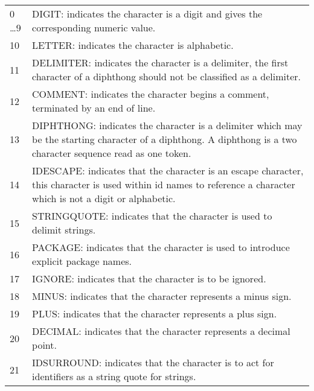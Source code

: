 \begin{tabular}{lp{13.0cm}}
0 \ldots 9 & DIGIT: indicates the character is a digit  and gives the 
                   	corresponding numeric value.\\
10 &       LETTER: indicates the character is alphabetic.\\
11 &       DELIMITER: indicates the character is a delimiter, the first
                    character of a diphthong should not be classified as
                    a delimiter.\\
12 &       COMMENT: indicates the character begins a comment, terminated
                  by an end of line.\\
13 &       DIPHTHONG: indicates the character is a delimiter which may be
																						the
                    starting character of a diphthong.  A diphthong is a
                    two character sequence read as one token.\\
14 &       IDESCAPE: indicates that the character is an escape character, this
                   character is used within id names to reference a character
                   which is not a digit or alphabetic.\\
15 &       STRINGQUOTE: indicates that the character is used to delimit strings.\\
16 &       PACKAGE: indicates that the character is used to introduce explicit
                  package names.\\
17 &       IGNORE: indicates that the character is to be ignored.\\
18 &       MINUS: indicates that the character represents a minus sign.\\
19 &       PLUS: indicates that the character represents a plus sign.\\
20 &       DECIMAL: indicates that the character represents a decimal point.\\
21 &       IDSURROUND: indicates that the character is to act for identifiers
                     as a string quote for strings.\\
\end{tabular}


